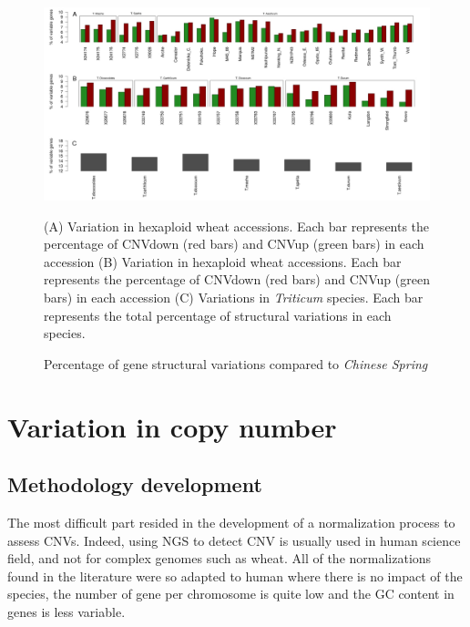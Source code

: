 \documentclass[a4paper, 12pt]{article}
\begin{document}
\begin{onehalfspace}
\newpage 
\thispagestyle{empty}
    \begin{figure}
      \centering \includegraphics[scale=0.28]{Figures/Figure_13.jpg}
      \vspace{0.5cm}
      \caption{Percentage of gene structural variations compared to \textit{Chinese Spring}} 
      \label{fig:F13}
    \footnotesize{(A) Variation in hexaploid wheat accessions. Each bar represents the percentage of CNVdown (red bars) and CNVup (green bars) in each accession
    (B) Variation in hexaploid wheat accessions. Each bar represents the percentage of CNVdown (red bars) and CNVup (green bars) in each accession
    (C) Variations in \textit{Triticum} species. Each bar represents the total percentage of structural variations in each species.}
    \end{figure}
\addtocounter{page}{-1}
\newpage
\clearpage 

    \section{Variation in copy number}
    
        \subsection{Methodology development}

The most difficult part resided in the development of a normalization process to assess CNVs. Indeed, using NGS to detect CNV is usually used in human science field, and not for complex genomes such as wheat. All of the normalizations found in the literature were so adapted to human where there is no impact of the species, the number of gene per chromosome is quite low and the GC content in genes is less variable.


\end{onehalfspace}
\end{document}
